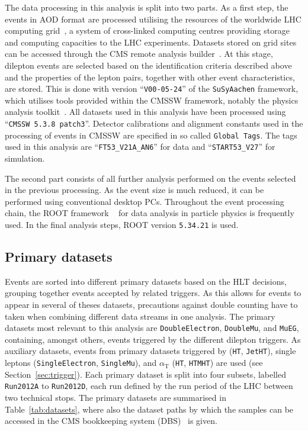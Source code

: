The data processing in this analysis is split into two parts. As a first step, the events in AOD format are processed utilising the resources of the worldwide LHC computing grid~\cite{doi:10.1146/annurev-nucl-102010-130059,WLCG}, a system of cross-linked computing centres providing storage and computing capacities to the LHC experiments.  Datasets stored on grid sites can be accessed through the CMS remote analysis builder~\cite{CRAB}. At this stage, dilepton events are selected based on the identification criteria described above and the properties of the lepton pairs, together with other event characteristics, are stored. This is done with version ``\verb+V00-05-24+'' of the \verb+SuSyAachen+ framework, which utilises tools provided within the CMSSW framework, notably the physics analysis toolkit~\cite{PATNote}. All datasets used in this analysis have been processed using ``\verb+CMSSW 5.3.8 patch3+''. Detector calibrations and alignment constants used in the processing of events in CMSSW are specified in so called \verb+Global Tags+. The tags used in this analysis are ``\verb+FT53_V21A_AN6+'' for data and ``\verb+START53_V27+'' for simulation.

The second part consists of all further analysis performed on the events selected in the previous processing. As the event size is much reduced, it can be performed using conventional desktop PCs. Throughout the event processing chain, the ROOT framework ~\cite{ROOT} for data analysis in particle physics is frequently used. In the final analysis steps, ROOT version \verb+5.34.21+ is used.  

\subsection{Primary datasets}

Events are sorted into different primary datasets based on the HLT decisions, grouping together events accepted by related triggers. As this allows for events to appear in several of theses datasets, precautions against double counting have to taken when combining different data streams in one analysis. The primary datasets most relevant to this analysis are \verb+DoubleElectron+, \verb+DoubleMu+, and \verb+MuEG+, containing, amongst others, events triggered by the different dilepton triggers. As auxiliary datasets, events from primary datasets triggered by \HT (\verb+HT+, \verb+JetHT+), single leptons (\verb+SingleElectron+, \verb+SingleMu+), and $\alpha_\mathrm{T}$ (\verb+HT+, \verb+HTMHT+) are used (see Section~\ref{sec:trigger}). Each primary dataset is split into four subsets, labelled \verb+Run2012A+ to \verb+Run2012D+, each run defined by the run period of the LHC between two technical stops. The primary datasets are summarised in Table~\ref{tab:datasets}, where also the dataset paths by which the samples can be accessed in the CMS bookkeeping system (DBS)~\cite{1742-6596-119-7-072001} is given.   

